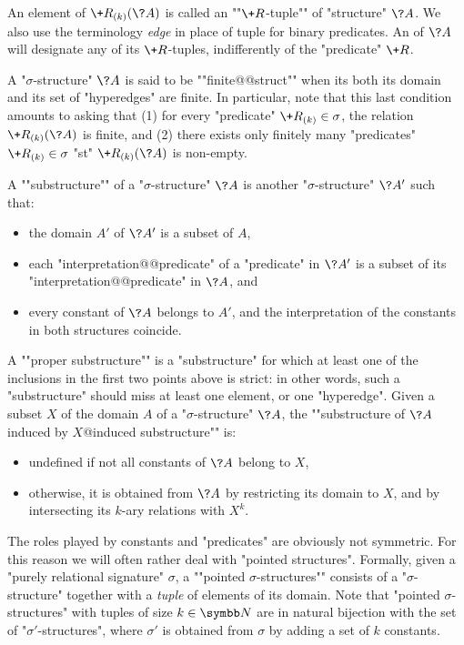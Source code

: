 An element of $\+R_{(k)}(\?A)$ is called an \AP""$\+R$-tuple""
of "structure" $\?A$. We also use the terminology \emph{edge} in place
of tuple for binary predicates.
An  of $\?A$ will designate any of its $\+R$-tuples,
indifferently of the "predicate" $\+R$.

A "$\sigma$-structure" $\?A$ is said to be \AP""finite@@struct"" when its
both its domain and its set of "hyperedges" are finite.
In particular, note that this last condition amounts to asking
that (1) for every "predicate" $\+R_{(k)} \in \sigma$, the relation $\+R_{(k)}(\?A)$ is finite,
and (2) there exists only finitely many "predicates" $\+R_{(k)} \in \sigma$
"st" $\+R_{(k)}(\?A)$ is non-empty.

A \AP""substructure"" of a "$\sigma$-structure" $\?A$ is another
"$\sigma$-structure" $\?A'$ such that:
\begin{itemize}
	\item the domain $A'$ of $\?A'$ is a subset of $A$,
	\item each "interpretation@@predicate" of a "predicate" in $\?A'$ 
		is a subset of its "interpretation@@predicate" in $\?A$, and
	\item every constant of $\?A$ belongs to $A'$, and the interpretation
		of the constants in both structures coincide. 
\end{itemize}
A \AP""proper substructure"" is a "substructure" for which
at least one of the inclusions in the first two points above
is strict: in other words, such a "substructure" should
miss at least one element, or one "hyperedge".
Given a subset $X$ of the domain $A$ of a "$\sigma$-structure" $\?A$,
the \AP""substructure of $\?A$ induced by $X$@induced substructure"" is:
\begin{itemize}
	\item undefined if not all constants of $\?A$ belong to $X$,
	\item otherwise, it is obtained from $\?A$ by restricting
		its domain to $X$, and by intersecting its $k$-ary relations
		with $X^k$.
\end{itemize}

The roles played by constants and "predicates" are obviously not symmetric.
For this reason we will often rather deal with "pointed structures".
Formally, given a "purely relational signature" $\sigma$,
a \AP""pointed $\sigma$-structures"" consists of a "$\sigma$-structure"
together with a \emph{tuple} of elements of its domain.
Note that "pointed $\sigma$-structures" with tuples of size $k\in \N$ are in natural
bijection with the set of "$\sigma'$-structures", where $\sigma'$
is obtained from $\sigma$ by adding a set of $k$ constants.

